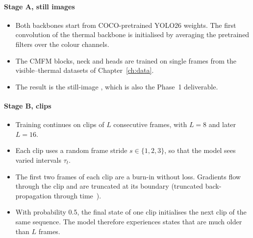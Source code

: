 \paragraph{Stage A, still images}
\begin{itemize}
  \item Both backbones start from COCO-pretrained YOLO26 weights. The first
        convolution of the thermal backbone is initialised by averaging the
        pretrained filters over the colour channels.
  \item The CMFM blocks, neck and heads are trained on single frames from
        the visible--thermal datasets of Chapter~\ref{ch:data}.
  \item The result is the still-image \method{}, which is also the Phase~1
        deliverable.
\end{itemize}

\paragraph{Stage B, clips}
\begin{itemize}
  \item Training continues on clips of $L$ consecutive frames, with $L=8$
        and later $L=16$.
  \item Each clip uses a random frame stride $s\in\{1,2,3\}$, so that the
        model sees varied intervals $\tau_t$.
  \item The first two frames of each clip are a burn-in without loss.
        Gradients flow through the clip and are truncated at its boundary
        (truncated back-propagation through time~\citep{williams1990tbptt}).
  \item With probability 0.5, the final state of one clip initialises the
        next clip of the same sequence. The model therefore experiences
        states that are much older than $L$ frames.
\end{itemize}

